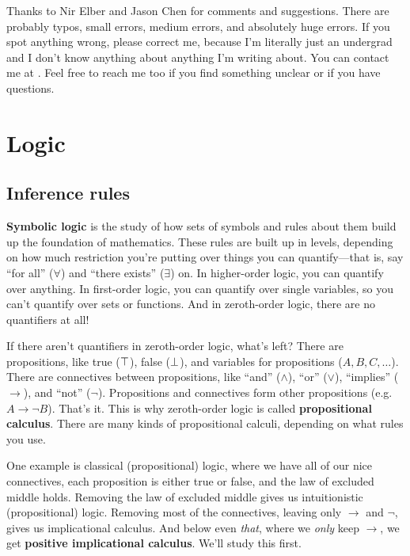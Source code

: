 \documentclass[11pt,paper=letter]{scrartcl}
\renewcommand{\land}{\wedge}
\renewcommand{\lor}{\vee}
\renewcommand{\lnot}{\neg}
\begin{document}
Thanks to Nir Elber and Jason Chen for comments and suggestions. There are probably typos, small errors, medium errors, and absolutely huge errors. If you spot anything wrong, please correct me, because I'm literally just an undergrad and I don't know anything about anything I'm writing about. You can contact me at . Feel free to reach me too if you find something unclear or if you have questions.

\clearpage

\section{Logic}

\subsection{Inference rules}

\textbf{Symbolic logic} is the study of how sets of symbols and rules about them build up the foundation of mathematics. These rules are built up in levels, depending on how much restriction you're putting over things you can quantify---that is, say ``for all'' ($\forall$) and ``there exists'' ($\exists$) on. In higher-order logic, you can quantify over anything. In first-order logic, you can quantify over single variables, so you can't quantify over sets or functions. And in zeroth-order logic, there are no quantifiers at all!

If there aren't quantifiers in zeroth-order logic, what's left? There are propositions, like true ($\top$), false ($\bot$), and variables for propositions ($A, B, C, \dots$). There are connectives between propositions, like ``and'' ($\land$), ``or'' ($\lor$), ``implies'' ($\to$), and ``not'' ($\lnot$). Propositions and connectives form other propositions (e.g. $A \to \lnot B$). That's it. This is why zeroth-order logic is called \textbf{propositional calculus}. There are many kinds of propositional calculi, depending on what rules you use.

One example is classical (propositional) logic, where we have all of our nice connectives, each proposition is either true or false, and the law of excluded middle holds. Removing the law of excluded middle gives us intuitionistic (propositional) logic. Removing most of the connectives, leaving only $\to$ and $\lnot$, gives us implicational calculus. And below even \emph{that}, where we \emph{only} keep $\to$, we get \textbf{positive implicational calculus}. We'll study this first.
\end{document}
